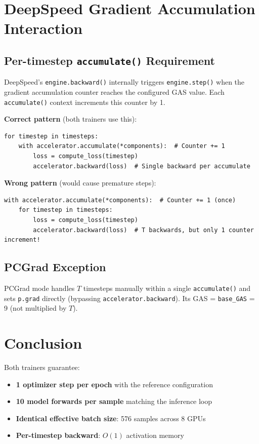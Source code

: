 \documentclass[11pt]{article}
\begin{document}
\section{DeepSpeed Gradient Accumulation Interaction}

\subsection{Per-timestep \texttt{accumulate()} Requirement}

DeepSpeed's \texttt{engine.backward()} internally triggers \texttt{engine.step()} when the gradient accumulation counter reaches the configured GAS value. Each \texttt{accumulate()} context increments this counter by 1.

\textbf{Correct pattern} (both trainers use this):
\begin{lstlisting}
for timestep in timesteps:
    with accelerator.accumulate(*components):  # Counter += 1
        loss = compute_loss(timestep)
        accelerator.backward(loss)  # Single backward per accumulate
\end{lstlisting}

\textbf{Wrong pattern} (would cause premature steps):
\begin{lstlisting}
with accelerator.accumulate(*components):  # Counter += 1 (once)
    for timestep in timesteps:
        loss = compute_loss(timestep)
        accelerator.backward(loss)  # T backwards, but only 1 counter increment!
\end{lstlisting}

\subsection{PCGrad Exception}

PCGrad mode handles $T$ timesteps manually within a single \texttt{accumulate()} and sets \texttt{p.grad} directly (bypassing \texttt{accelerator.backward}). Its GAS = \texttt{base\_GAS} = 9 (not multiplied by $T$).

\section{Conclusion}

Both trainers guarantee:
\begin{itemize}[nosep]
    \item \textbf{1 optimizer step per epoch} with the reference configuration
    \item \textbf{10 model forwards per sample} matching the inference loop
    \item \textbf{Identical effective batch size}: 576 samples across 8 GPUs
    \item \textbf{Per-timestep backward}: $O(1)$ activation memory
\end{itemize}
\end{document}
